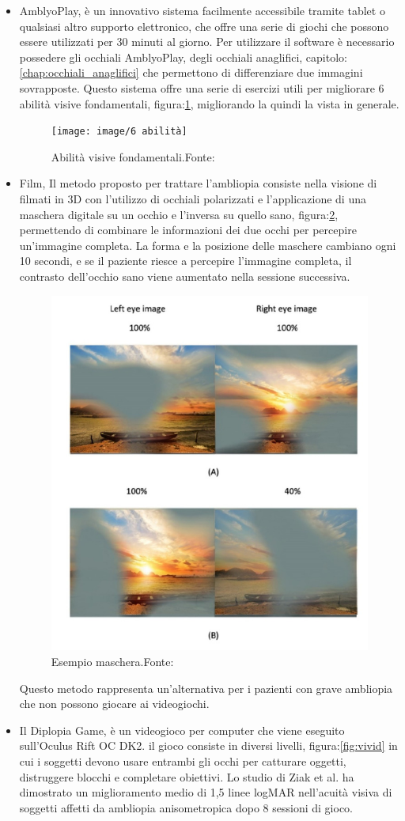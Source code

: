\documentclass[
a4paper,
cleardoublepage=empty,
headings=twolinechapter,
numbers=autoenddot,
]{scrbook}
\begin{document}
\begin{itemize}
		\item AmblyoPlay, è un innovativo sistema facilmente accessibile tramite tablet o qualsiasi altro supporto elettronico, che offre una serie di giochi che possono essere utilizzati per 30 minuti al giorno. Per utilizzare il software è necessario possedere gli occhiali AmblyoPlay, degli occhiali anaglifici, capitolo:\ref{chap:occhiali_anaglifici} che permettono di differenziare due immagini sovrapposte. Questo sistema offre una serie di esercizi utili per migliorare 6 abilità visive fondamentali, figura:\ref{fig:6 abilità}, migliorando la quindi la vista in generale.
    	\begin{figure}[H]
			\centering
			\texttt{[image: image/6 abilità]}
			\caption{Abilità visive fondamentali.Fonte:\cite{amblyoplay}}
			\label{fig:6 abilità}
     	\end{figure}
		\item Film, Il metodo proposto per trattare l'ambliopia consiste nella visione di filmati in 3D con l'utilizzo di occhiali polarizzati e l'applicazione di una maschera digitale su un occhio e l'inversa su quello sano, figura:\ref{fig:film}, permettendo di combinare le informazioni dei due occhi per percepire un'immagine completa. La forma e la posizione delle maschere cambiano ogni 10 secondi, e se il paziente riesce a percepire l'immagine completa, il contrasto dell'occhio sano viene aumentato nella sessione successiva. 
		\begin{figure}[H]
			\centering
			\includegraphics[width=0.5\linewidth]{image/filmAmblio}
			\caption{Esempio maschera.Fonte:\cite{nuoviTrattamenti}}
			\label{fig:film}
		\end{figure}
	    Questo metodo rappresenta un'alternativa per i pazienti con grave ambliopia che non possono giocare ai videogiochi.
	    \item Il Diplopia Game, è un videogioco per computer che viene eseguito sull'Oculus Rift OC DK2. il gioco consiste in diversi livelli, figura:\ref{fig:vivid} in cui i soggetti devono usare entrambi gli occhi per catturare oggetti, distruggere blocchi e completare obiettivi. Lo studio di Ziak et al. ha dimostrato un miglioramento medio di 1,5 linee logMAR nell'acuità visiva di soggetti affetti da ambliopia anisometropica dopo 8 sessioni di gioco.

\end{itemize}
\end{document}

